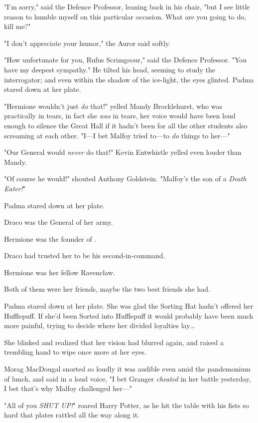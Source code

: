 "I'm sorry," said the Defence Professor, leaning back in his chair, "but I see
little reason to humble myself on this particular occasion. What are you going
to do, kill me?"

"I don't appreciate your humor," the Auror said softly.

"How unfortunate for you, Rufus Scrimgeour," said the Defence Professor. "You
have my deepest sympathy." He tilted his head, seeming to study the
interrogator; and even within the shadow of the ice-light, the eyes glinted.
\later
Padma stared down at her plate.

"Hermione wouldn't just \emph{do} that!" yelled Mandy Brocklehurst, who was
practically in tears, in fact she \emph{was} in tears, her voice would have
been loud enough to silence the Great Hall if it hadn't been for all the other
students also screaming at each other. "I---I bet Malfoy tried to---to
\emph{do} things to her---"

"Our General would \emph{never} do that!" Kevin Entwhistle yelled even louder
than Mandy.

"Of course he would!" shouted Anthony Goldstein. "Malfoy's the son of a
\emph{Death Eater!}"

Padma stared down at her plate.

Draco was the General of her army.

Hermione was the founder of \SPHEW.

Draco had trusted her to be his second-in-command.

Hermione was her fellow Ravenclaw.

Both of them were her friends, maybe the two best friends she had.

Padma stared down at her plate. She was glad the Sorting Hat hadn't offered her
Hufflepuff. If she'd been Sorted into Hufflepuff it would probably have been
much more painful, trying to decide where her divided loyalties lay{\ldots}

She blinked and realized that her vision had blurred again, and raised a
trembling hand to wipe once more at her eyes.

Morag MacDougal snorted so loudly it was audible even amid the pandemonium of
lunch, and said in a loud voice, "I bet Granger \emph{cheated} in her battle
yesterday, I bet that's why Malfoy challenged her---"

"All of you \emph{SHUT UP!}" roared Harry Potter, as he hit the table with his
fists so hard that plates rattled all the way along it.

